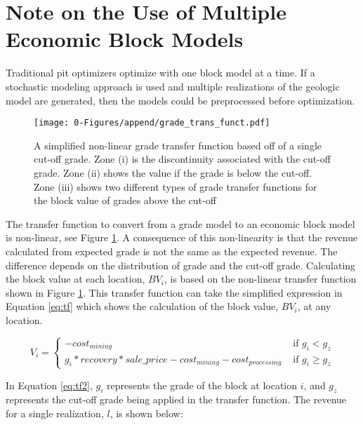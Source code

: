 \section{Note on the Use of Multiple Economic Block Models}
\label{sect:mult_ebm}
    Traditional pit optimizers optimize with one block model at a time. If a stochastic modeling approach is used and multiple realizations of the geologic model are generated, then the models could be preprocessed before optimization.

    \begin{figure}[hbt] %
        \centering
        \texttt{[image: 0-Figures/append/grade\_trans\_funct.pdf]}
        \caption[Simplified grade transfer function]{A simplified non-linear grade transfer function based off of a single cut-off grade. Zone (i) is the discontinuity associated with the cut-off grade. Zone (ii) shows the value if the grade is below the cut-off. Zone (iii) shows two different types of grade transfer functions for the block value of grades above the cut-off}
        \label{fig:grade_tf}
    \end{figure}

    The transfer function to convert from a grade model to an economic block model is non-linear, see Figure \ref{fig:grade_tf}. A consequence of this non-linearity is that the revenue calculated from expected grade is not the same as the expected revenue. The difference depends on the distribution of grade and the cut-off grade. Calculating the block value at each location, $BV_i$, is based on the non-linear transfer function shown in Figure \ref{fig:grade_tf}. This transfer function can take the simplified expression in Equation \ref{eq:tf} which shows the calculation of the block value, $BV_i$, at any location.

    \begin{equation} %
        V_i =\begin{cases}
        -cost_{mining} & \text{ if } g_i < g_z \\
        g_i*recovery*sale\_price - cost_{mining} - cost_{processing} & \text{ if } g_i \geq g_z
        \end{cases}
        \label{eq:tf2}
    \end{equation}

    In Equation \ref{eq:tf2}, $g_i$ represents the grade of the block at location $i$, and $g_z$ represents the cut-off grade being applied in the transfer function. The revenue for a single realization, $l$, is shown below:

